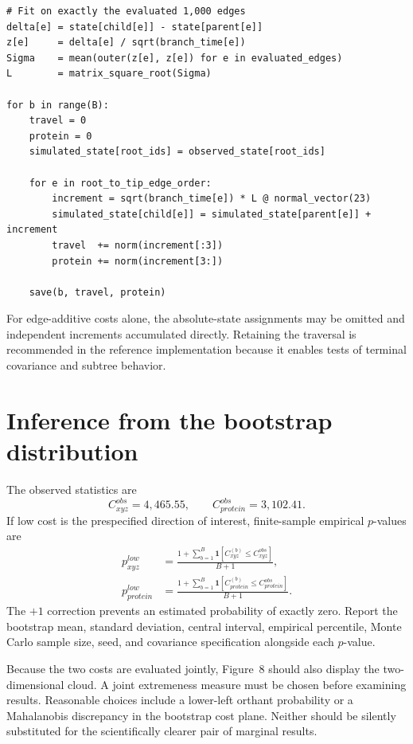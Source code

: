 \documentclass[10pt]{article}
\begin{document}
\begin{verbatim}
# Fit on exactly the evaluated 1,000 edges
delta[e] = state[child[e]] - state[parent[e]]
z[e]     = delta[e] / sqrt(branch_time[e])
Sigma    = mean(outer(z[e], z[e]) for e in evaluated_edges)
L        = matrix_square_root(Sigma)

for b in range(B):
    travel = 0
    protein = 0
    simulated_state[root_ids] = observed_state[root_ids]

    for e in root_to_tip_edge_order:
        increment = sqrt(branch_time[e]) * L @ normal_vector(23)
        simulated_state[child[e]] = simulated_state[parent[e]] + increment
        travel  += norm(increment[:3])
        protein += norm(increment[3:])

    save(b, travel, protein)
\end{verbatim}

For edge-additive costs alone, the absolute-state assignments may be omitted
and independent increments accumulated directly.  Retaining the traversal is
recommended in the reference implementation because it enables tests of
terminal covariance and subtree behavior.

\section{Inference from the bootstrap distribution}

The observed statistics are
\[
  C_{xyz}^{obs}=4{,}465.55,
  \qquad
  C_{protein}^{obs}=3{,}102.41.
\]
If low cost is the prespecified direction of interest, finite-sample empirical
$p$-values are
\begin{align}
 p_{xyz}^{low}
  &= \frac{1+\sum_{b=1}^{B}
       \mathbf{1}\!\left[C_{xyz}^{(b)}\le C_{xyz}^{obs}\right]}{B+1},\\
 p_{protein}^{low}
  &= \frac{1+\sum_{b=1}^{B}
       \mathbf{1}\!\left[C_{protein}^{(b)}\le C_{protein}^{obs}\right]}{B+1}.
\end{align}
The $+1$ correction prevents an estimated probability of exactly zero.  Report
the bootstrap mean, standard deviation, central interval, empirical percentile,
Monte Carlo sample size, seed, and covariance specification alongside each
$p$-value.

Because the two costs are evaluated jointly, Figure~8 should also display the
two-dimensional cloud.  A joint extremeness measure must be chosen before
examining results.  Reasonable choices include a lower-left orthant probability
or a Mahalanobis discrepancy in the bootstrap cost plane.  Neither should be
silently substituted for the scientifically clearer pair of marginal results.
\end{document}
